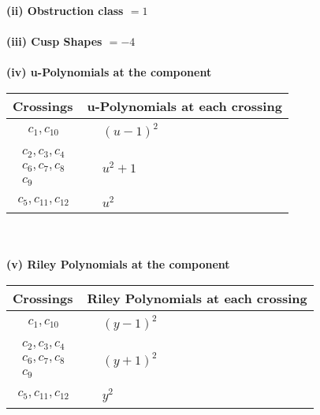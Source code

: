 \documentclass[1p]{elsarticle_modified}
\theoremstyle{definition}
\begin{document}
\flushleft \textbf{(ii) Obstruction class $= 1$}\\~\\
\flushleft \textbf{(iii) Cusp Shapes $= -4$}\\~\\
\newpage\renewcommand{\arraystretch}{1}
\flushleft \textbf{(iv) u-Polynomials at the component}\newline \\
\begin{tabular}{m{50pt}|m{274pt}}
Crossings & \hspace{64pt}u-Polynomials at each crossing \\
\hline $$\begin{aligned}c_{1},c_{10}\end{aligned}$$&$\begin{aligned}
&(u-1)^2
\end{aligned}$\\
\hline $$\begin{aligned}c_{2},c_{3},c_{4}\\c_{6},c_{7},c_{8}\\c_{9}\end{aligned}$$&$\begin{aligned}
&u^2+1
\end{aligned}$\\
\hline $$\begin{aligned}c_{5},c_{11},c_{12}\end{aligned}$$&$\begin{aligned}
&u^2
\end{aligned}$\\
\hline
\end{tabular}\\~\\
\newpage\renewcommand{\arraystretch}{1}
\flushleft \textbf{(v) Riley Polynomials at the component}\newline \\
\begin{tabular}{m{50pt}|m{274pt}}
Crossings & \hspace{64pt}Riley Polynomials at each crossing \\
\hline $$\begin{aligned}c_{1},c_{10}\end{aligned}$$&$\begin{aligned}
&(y-1)^2
\end{aligned}$\\
\hline $$\begin{aligned}c_{2},c_{3},c_{4}\\c_{6},c_{7},c_{8}\\c_{9}\end{aligned}$$&$\begin{aligned}
&(y+1)^2
\end{aligned}$\\
\hline $$\begin{aligned}c_{5},c_{11},c_{12}\end{aligned}$$&$\begin{aligned}
&y^2
\end{aligned}$\\
\hline
\end{tabular}\\~\\
\end{document}
